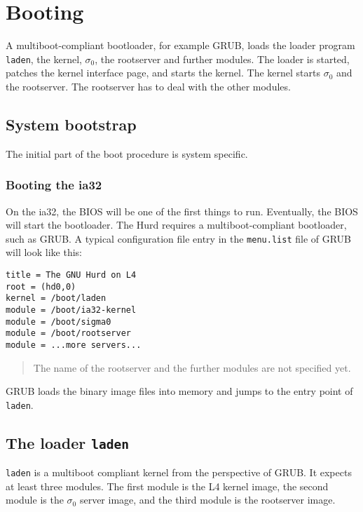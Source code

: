 \documentclass[9pt,a4paper]{extarticle}
\newenvironment{comment}{\footnotesize \begin{quote}}{\end{quote}}
\begin{document}
\section{Booting}

A multiboot-compliant bootloader, for example GRUB, loads the loader
program \texttt{laden}, the kernel, $\sigma_0$, the rootserver and
further modules.  The loader is started, patches the kernel interface
page, and starts the kernel.  The kernel starts $\sigma_0$ and the
rootserver.  The rootserver has to deal with the other modules.


\subsection{System bootstrap}

The initial part of the boot procedure is system specific.


\subsubsection{Booting the ia32}

On the ia32, the BIOS will be one of the first things to run.
Eventually, the BIOS will start the bootloader.  The Hurd requires a
multiboot-compliant bootloader, such as GRUB.  A typical configuration
file entry in the \verb/menu.list/ file of GRUB will look like this:

\begin{verbatim}
title = The GNU Hurd on L4
root = (hd0,0)
kernel = /boot/laden
module = /boot/ia32-kernel
module = /boot/sigma0
module = /boot/rootserver
module = ...more servers...
\end{verbatim}

\begin{comment}
  The name of the rootserver and the further modules are not specified
  yet.
\end{comment}

GRUB loads the binary image files into memory and jumps to the entry
point of \texttt{laden}.


\subsection{The loader \texttt{laden}}

\texttt{laden} is a multiboot compliant kernel from the perspective of
GRUB.  It expects at least three modules.  The first module is the L4
kernel image, the second module is the $\sigma_0$ server image, and
the third module is the rootserver image.
\end{document}
